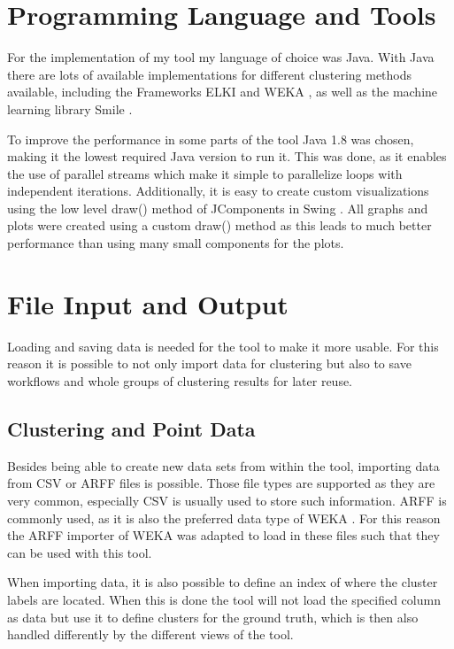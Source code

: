 \documentclass[
	a4paper,
	english,
	twoside,
	openright,               
	11pt                            
	]{report}
\begin{document}
\section{Programming Language and Tools}
For the implementation of my tool my language of choice was Java. With Java there are lots of available implementations for different clustering methods available, including the Frameworks ELKI \cite{10.1007/978-3-540-69497-7_41} and WEKA \cite{10.1145/1656274.1656278}, as well as the machine learning library Smile \cite{javasmile}. 

To improve the performance in some parts of the tool Java 1.8 was chosen, making it the lowest required Java version to run it. This was done, as it enables the use of parallel streams which make it simple to parallelize loops with independent iterations. Additionally, it is easy to create custom visualizations using the low level draw() method of JComponents in Swing \cite{javaswing}. All graphs and plots were created using a custom draw() method as this leads to much better performance than using many small components for the plots.

\section{File Input and Output}
Loading and saving data is needed for the tool to make it more usable. For this reason it is possible to not only import data for clustering but also to save workflows and whole groups of clustering results for later reuse.
\subsection{Clustering and Point Data}
Besides being able to create new data sets from within the tool, importing data from CSV or ARFF files is possible. Those file types are supported as they are very common, especially CSV is usually used to store such information. ARFF is commonly used, as it is also the preferred data type of WEKA \cite{10.1145/1656274.1656278}. For this reason the ARFF importer of WEKA was adapted to load in these files such that they can be used with this tool. 

When importing data, it is also possible to define an index of where the cluster labels are located. When this is done the tool will not load the specified column as data but use it to define clusters for the ground truth, which is then also handled differently by the different views of the tool.
\end{document}
